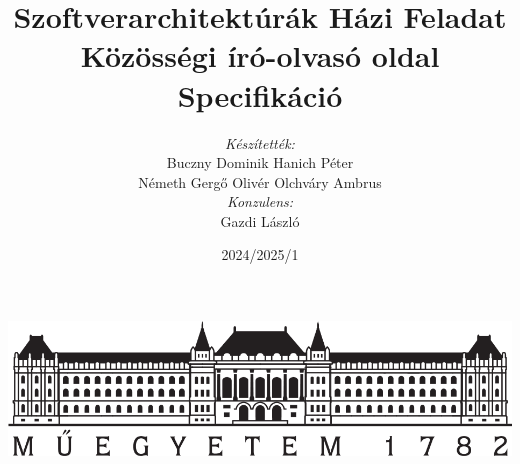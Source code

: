 \author{\textit{Készítették:}\\ Buczny Dominik \hspace{5pt} Hanich Péter \\ Németh Gergő Olivér \hspace{5pt} Olchváry Ambrus \\[10pt] \textit{Konzulens:}\\ Gazdi László}
\title{Szoftverarchitektúrák Házi Feladat \\ Közösségi író-olvasó oldal \\ \textbf{Specifikáció}}
\date{2024/2025/1}
\maketitle
\thispagestyle{empty}
\begin{center}
    \includegraphics[width=\textwidth,height=\textheight,keepaspectratio]{./figures/logo.png}
\end{center}